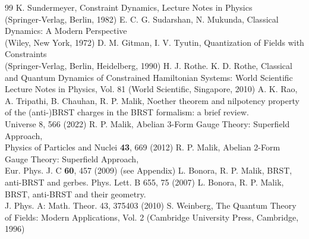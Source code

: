 \documentclass[12pt]{article}
\begin{document}
{\begin{thebibliography}{99}
 K. Sundermeyer, Constraint Dynamics, Lecture Notes in Physics \\(Springer-Verlag, Berlin, 1982)
 E. C. G. Sudarshan, N. Mukunda, Classical Dynamics: A Modern Perspective \\(Wiley, New York, 1972)
 D. M. Gitman, I. V. Tyutin, Quantization of Fields with Constraints \\(Springer-Verlag, Berlin, Heidelberg, 1990)
 H. J. Rothe. K. D. Rothe, Classical and Quantum Dynamics of Constrained Hamiltonian Systems: World Scientific Lecture Notes in Physics, Vol. 81
                (World Scientific, Singapore, 2010)  
 A. K. Rao, A. Tripathi, B. Chauhan, R. P. Malik, Noether theorem and nilpotency property of the (anti-)BRST charges in 
                the BRST formalism: a brief review.\\ Universe 8, 566 (2022)
     R. P. Malik,  Abelian 3-Form Gauge Theory: Superfield Approach, \\
                    Physics of Particles and Nuclei {\bf 43}, 669 (2012)                
      R. P. Malik, Abelian 2-Form Gauge Theory: Superfield Approach, \\ Eur. Phys. J. C {\bf 60}, 457 (2009) (see Appendix)
 L. Bonora, R. P. Malik, BRST, anti-BRST and gerbes. Phys. Lett. B 655, 75 (2007)
 L. Bonora, R. P. Malik, BRST, anti-BRST and their geometry. \\J. Phys. A: Math. Theor. 43, 375403 (2010)
 S. Weinberg, The Quantum Theory of Fields: Modern Applications, Vol. 2 (Cambridge University Press, Cambridge, 1996)


\end{thebibliography}}
\end{document}
